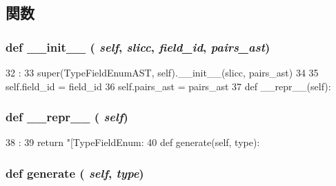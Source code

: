 \subsection{関数}
\hypertarget{classslicc_1_1ast_1_1TypeFieldEnumAST_1_1TypeFieldEnumAST_ac775ee34451fdfa742b318538164070e}{
\subsubsection[{\_\-\_\-init\_\-\_\-}]{\setlength{\rightskip}{0pt plus 5cm}def \_\-\_\-init\_\-\_\- ( {\em self}, \/   {\em slicc}, \/   {\em field\_\-id}, \/   {\em pairs\_\-ast})}}
\label{classslicc_1_1ast_1_1TypeFieldEnumAST_1_1TypeFieldEnumAST_ac775ee34451fdfa742b318538164070e}



\begin{DoxyCode}
32                                                   :
33         super(TypeFieldEnumAST, self).__init__(slicc, pairs_ast)
34 
35         self.field_id = field_id
36         self.pairs_ast = pairs_ast
37 
    def __repr__(self):
\end{DoxyCode}
\hypertarget{classslicc_1_1ast_1_1TypeFieldEnumAST_1_1TypeFieldEnumAST_ad8b9328939df072e4740cd9a63189744}{
\subsubsection[{\_\-\_\-repr\_\-\_\-}]{\setlength{\rightskip}{0pt plus 5cm}def \_\-\_\-repr\_\-\_\- ( {\em self})}}
\label{classslicc_1_1ast_1_1TypeFieldEnumAST_1_1TypeFieldEnumAST_ad8b9328939df072e4740cd9a63189744}



\begin{DoxyCode}
38                       :
39         return "[TypeFieldEnum: %
40 
    def generate(self, type):
\end{DoxyCode}
\hypertarget{classslicc_1_1ast_1_1TypeFieldEnumAST_1_1TypeFieldEnumAST_a4555d1cee0dccf3942ea35fe86de2e8e}{
\subsubsection[{generate}]{\setlength{\rightskip}{0pt plus 5cm}def generate ( {\em self}, \/   {\em type})}}
\label{classslicc_1_1ast_1_1TypeFieldEnumAST_1_1TypeFieldEnumAST_a4555d1cee0dccf3942ea35fe86de2e8e}



